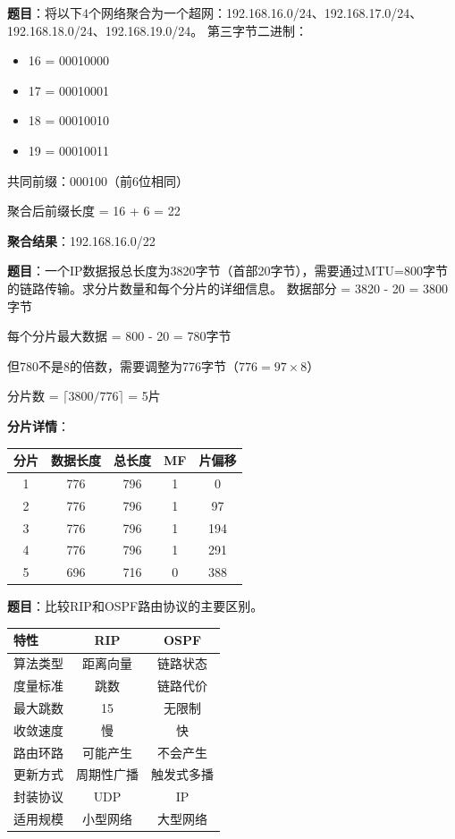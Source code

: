 \begin{examplebox}
\textbf{题目}：将以下4个网络聚合为一个超网：192.168.16.0/24、192.168.17.0/24、192.168.18.0/24、192.168.19.0/24。
\tcblower
第三字节二进制：
\begin{itemize}[itemsep=0pt]
    \item 16 = 00010000
    \item 17 = 00010001
    \item 18 = 00010010
    \item 19 = 00010011
\end{itemize}

共同前缀：000100（前6位相同）

聚合后前缀长度 = 16 + 6 = 22

\textbf{聚合结果}：192.168.16.0/22
\end{examplebox}

\begin{examplebox}
\textbf{题目}：一个IP数据报总长度为3820字节（首部20字节），需要通过MTU=800字节的链路传输。求分片数量和每个分片的详细信息。
\tcblower
数据部分 = 3820 - 20 = 3800字节

每个分片最大数据 = 800 - 20 = 780字节

但780不是8的倍数，需要调整为776字节（$776 = 97 \times 8$）

分片数 = $\lceil 3800/776 \rceil$ = 5片

\textbf{分片详情}：
\begin{center}\small
\begin{tabular}{|c|c|c|c|c|}
\hline
分片 & 数据长度 & 总长度 & MF & 片偏移 \\
\hline
1 & 776 & 796 & 1 & 0 \\
2 & 776 & 796 & 1 & 97 \\
3 & 776 & 796 & 1 & 194 \\
4 & 776 & 796 & 1 & 291 \\
5 & 696 & 716 & 0 & 388 \\
\hline
\end{tabular}
\end{center}
\end{examplebox}

\begin{examplebox}
\textbf{题目}：比较RIP和OSPF路由协议的主要区别。
\tcblower
\begin{center}\small
\begin{tabular}{|l|c|c|}
\hline
\textbf{特性} & \textbf{RIP} & \textbf{OSPF} \\
\hline
算法类型 & 距离向量 & 链路状态 \\
度量标准 & 跳数 & 链路代价 \\
最大跳数 & 15 & 无限制 \\
收敛速度 & 慢 & 快 \\
路由环路 & 可能产生 & 不会产生 \\
更新方式 & 周期性广播 & 触发式多播 \\
封装协议 & UDP & IP \\
适用规模 & 小型网络 & 大型网络 \\
\hline
\end{tabular}
\end{center}
\end{examplebox}
